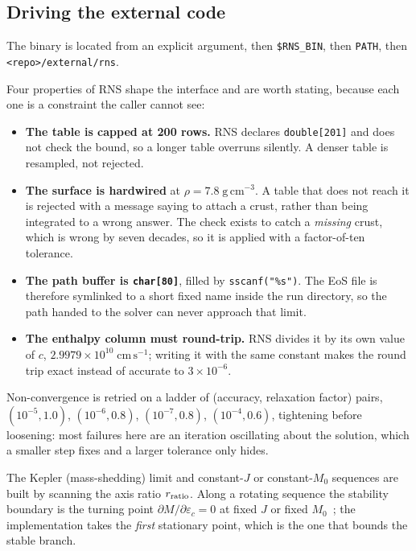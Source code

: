 \documentclass[aps,prc,onecolumn,superscriptaddress,nofootinbib,10pt]{revtex4-2}
\begin{document}
\subsection{Driving the external code}
\label{sec:rnsinterface}

The
binary is located from an explicit argument, then \texttt{\$RNS\_BIN}, then
\texttt{PATH}, then \texttt{<repo>/external/rns}.

Four properties of RNS shape the interface and are worth stating, because each
one is a constraint the caller cannot see:

\begin{itemize}
\item \textbf{The table is capped at 200 rows.} RNS declares
  \texttt{double[201]} and does not check the bound, so a longer table
  overruns silently. A denser table is resampled, not rejected.
\item \textbf{The surface is hardwired} at $\rho = 7.8\;\mathrm{g\,cm^{-3}}$.
  A table that does not reach it is rejected with a message saying to attach a
  crust, rather than being integrated to a wrong answer. The check exists to
  catch a \emph{missing} crust, which is wrong by seven decades, so it is
  applied with a factor-of-ten tolerance.
\item \textbf{The path buffer is \texttt{char[80]}}, filled by
  \texttt{sscanf("\%s")}. The EoS file is therefore symlinked to a short fixed
  name inside the run directory, so the path handed to the solver can never
  approach that limit.
\item \textbf{The enthalpy column must round-trip.} RNS divides it by its own
  value of $c$, $2.9979\times10^{10}\;\mathrm{cm\,s^{-1}}$; writing it with the
  same constant makes the round trip exact instead of accurate to $3\times
  10^{-6}$.
\end{itemize}

\noindent
Non-convergence is retried on a ladder of (accuracy, relaxation factor) pairs,
$(10^{-5}, 1.0)$, $(10^{-6}, 0.8)$, $(10^{-7}, 0.8)$, $(10^{-4}, 0.6)$,
tightening before loosening: most failures here are an iteration oscillating
about the solution, which a smaller step fixes and a larger tolerance only
hides.

The Kepler (mass-shedding) limit and constant-$J$ or constant-$M_0$ sequences
are built by scanning the axis ratio $r_{\rm ratio}$. Along a rotating sequence
the stability boundary is the turning point $\partial M/\partial \varepsilon_c
= 0$ at fixed $J$ or fixed $M_0$~\cite{FriedmanIpserSorkin1988}; the
implementation takes the \emph{first} stationary point, which is the one that
bounds the stable branch.
\end{document}

